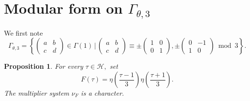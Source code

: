\documentclass[12pt]{article}
\theoremstyle{definition}
\newtheorem{proposition}[theorem]{Proposition}
\numberwithin{equation}{section}
\numberwithin{theorem}{section}
\begin{document}
\section{Modular form on $\Gamma_{\theta,3}$ }
\label{sec:level3}


We first note 
\begin{equation*}
\Gamma_{\theta,3}
=
\left\{
\begin{pmatrix}
a & b \\
c & d
\end{pmatrix}
\in
\Gamma(1) \,\Big| \,
\begin{pmatrix}
a & b \\
c & d
\end{pmatrix}
\equiv 
\pm
\begin{pmatrix}
1 & 0 \\
0 & 1
\end{pmatrix}, 
\pm
\begin{pmatrix}
0 & -1 \\
1 & 0
\end{pmatrix} 
\bmod{3}
\right\}.
\end{equation*}


\begin{proposition}
\label{prop:character-level3}
{\it
For every $\tau\in\mathscr{H},$
set 
\begin{equation*}
F(\tau)= \eta \left(\frac{\tau-1}{3} \right) \eta\left(\frac{\tau+1}{3} \right).
\end{equation*}
The multiplier system $\nu_{F}$ is a character. 
}
\end{proposition}
\end{document}
